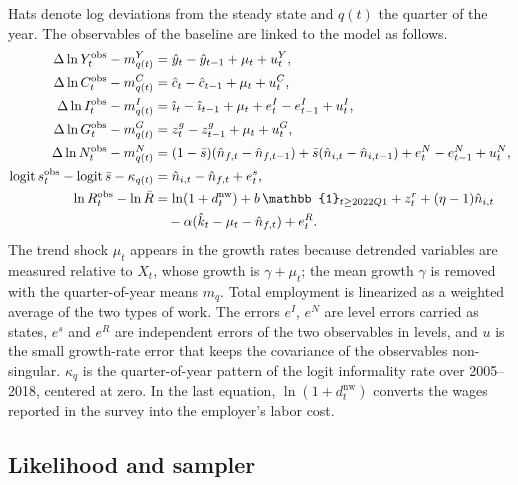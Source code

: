 Hats denote log deviations from the steady state and $q(t)$ the quarter of the year. The observables of the baseline are linked to the model as follows.
\begin{align*}
\Delta\ln Y^{\mathrm{obs}}_t - m^{Y}_{q(t)} &= \hat y_t - \hat y_{t-1} + \mu_t + u^Y_t,\\
\Delta\ln C^{\mathrm{obs}}_t - m^{C}_{q(t)} &= \hat c_t - \hat c_{t-1} + \mu_t + u^C_t,\\
\Delta\ln I^{\mathrm{obs}}_t - m^{I}_{q(t)} &= \hat\imath_t - \hat\imath_{t-1} + \mu_t + e^I_t - e^I_{t-1} + u^I_t,\\
\Delta\ln G^{\mathrm{obs}}_t - m^{G}_{q(t)} &= z^g_t - z^g_{t-1} + \mu_t + u^G_t,\\
\Delta\ln N^{\mathrm{obs}}_t - m^{N}_{q(t)} &= (1-\bar s)(\hat n_{f,t}-\hat n_{f,t-1}) + \bar s(\hat n_{i,t}-\hat n_{i,t-1}) + e^N_t - e^N_{t-1} + u^N_t,\\
\logit s^{\mathrm{obs}}_t - \logit\bar s - \kappa_{q(t)} &= \hat n_{i,t} - \hat n_{f,t} + e^s_t,\\
\ln R^{\mathrm{obs}}_t - \ln\bar R
&= \ln(1+d_t^{\mathrm{nw}}) + b\,\mathbb{1}_{t\ge2022Q1}
  + z^r_t + (\eta-1)\hat n_{i,t} \\
&\quad - \alpha(\hat k_t - \mu_t - \hat n_{f,t}) + e^R_t .
\end{align*}
The trend shock $\mu_t$ appears in the growth rates because detrended variables are measured relative to $X_t$, whose growth is $\gamma+\mu_t$; the mean growth $\gamma$ is removed with the quarter-of-year means $m_q$. Total employment is linearized as a weighted average of the two types of work. The errors $e^I$, $e^N$ are level errors carried as states, $e^s$ and $e^R$ are independent errors of the two observables in levels, and $u$ is the small growth-rate error that keeps the covariance of the observables non-singular. $\kappa_q$ is the quarter-of-year pattern of the logit informality rate over 2005--2018, centered at zero. In the last equation, $\ln(1+d_t^{\mathrm{nw}})$ converts the wages reported in the survey into the employer's labor cost.

\subsection{Likelihood and sampler}

